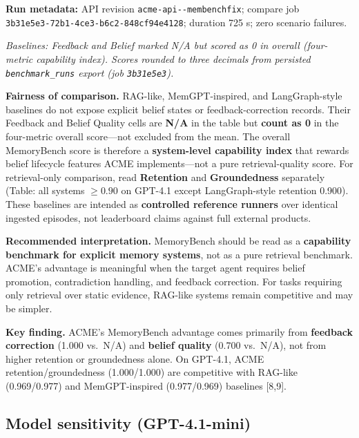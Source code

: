 \documentclass[11pt,a4paper]{article}
\begin{document}
\textbf{Run metadata:} API revision \texttt{acme-api-\/-membenchfix};
compare job\\
\texttt{3b31e5e3-72b1-4ce3-b6c2-848cf94e4128}; duration 725 s; zero
scenario failures.

\acmeResultSummary

\acmeTableMain

\emph{Baselines: Feedback and Belief marked N/A but scored as 0 in
overall (four-metric capability index). Scores rounded to three decimals
from persisted \texttt{benchmark\_runs} export (job \texttt{3b31e5e3}).}

\textbf{Fairness of comparison.} RAG-like, MemGPT-inspired, and
LangGraph-style baselines do not expose explicit belief states or
feedback-correction records. Their Feedback and Belief Quality cells are
\textbf{N/A} in the table but \textbf{count as 0} in the four-metric
overall score---not excluded from the mean. The overall MemoryBench
score is therefore a \textbf{system-level capability index} that rewards
belief lifecycle features ACME implements---not a pure retrieval-quality
score. For retrieval-only comparison, read \textbf{Retention} and
\textbf{Groundedness} separately (Table: all systems \(\geq 0.90\) on
GPT-4.1 except LangGraph-style retention 0.900). These baselines are
intended as \textbf{controlled reference runners} over identical
ingested episodes, not leaderboard claims against full external
products.

\textbf{Recommended interpretation.} MemoryBench should be read as a
\textbf{capability benchmark for explicit memory systems}, not as a pure
retrieval benchmark. ACME's advantage is meaningful when the target
agent requires belief promotion, contradiction handling, and feedback
correction. For tasks requiring only retrieval over static evidence,
RAG-like systems remain competitive and may be simpler.

\begin{keyfinding}
\textbf{Key finding.} ACME's MemoryBench advantage comes primarily from \textbf{feedback correction} (1.000 vs.\ N/A) and \textbf{belief quality} (0.700 vs.\ N/A), not from higher retention or groundedness alone. On GPT-4.1, ACME retention/groundedness (1.000/1.000) are competitive with RAG-like (0.969/0.977) and MemGPT-inspired (0.977/0.969) baselines [8,9].
\end{keyfinding}

\acmeTableMemoryBenchCI

\subsection{Model sensitivity
(GPT-4.1-mini)}\label{model-sensitivity-gpt-4.1-mini}
\end{document}
